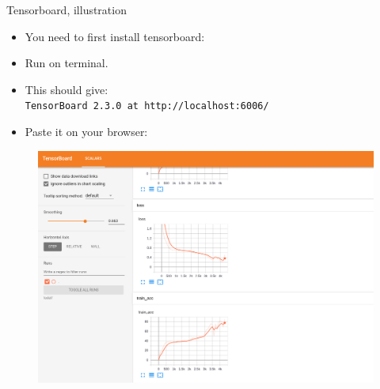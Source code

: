 \begin{frame}[fragile]{Tensorboard, illustration}
\begin{itemize}
\item You need to first install tensorboard: 
\item Run  on terminal.
\item This should give:\\ \texttt{TensorBoard 2.3.0 at http://localhost:6006/}
\item Paste it on your browser:
\end{itemize}
\begin{figure}
                        \centering
                        \includegraphics[width=.6\linewidth]{./figures/tensorboard.png}
\end{figure}
\end{frame}


